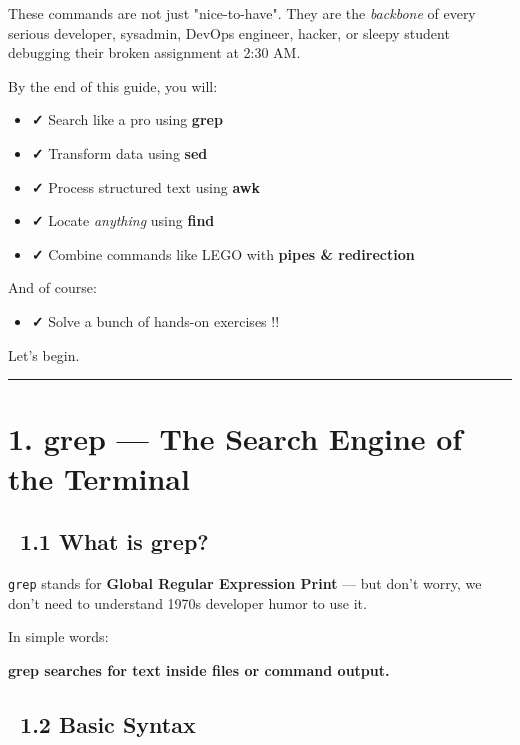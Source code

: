 \documentclass[12pt]{article}
\newcommand{\searchicon}{\faSearch}
\newcommand{\brainicon}{\faBrain}
\newcommand{\checkicon}{\faCheck}
\begin{document}
These commands are not just "nice-to-have".
They are the \textit{backbone} of every serious developer, sysadmin, DevOps engineer, hacker, or sleepy student debugging their broken assignment at 2:30 AM.

By the end of this guide, you will:

\begin{itemize}
    \item \textbf{\checkicon} Search like a pro using \textbf{grep}
    \item \textbf{\checkicon} Transform data using \textbf{sed}
    \item \textbf{\checkicon} Process structured text using \textbf{awk}
    \item \textbf{\checkicon} Locate \textit{anything} using \textbf{find}
    \item \textbf{\checkicon} Combine commands like LEGO with \textbf{pipes \& redirection}
\end{itemize}

And of course:
\begin{itemize}
    \item \textbf{\checkicon} Solve a bunch of hands-on exercises !!
\end{itemize}

Let's begin.

\vspace{1em}
\begin{center}
\color{teamred}\rule{0.8\textwidth}{1pt}
\end{center}

\section*{1. grep — The Search Engine of the Terminal}

\subsection*{\searchicon\ 1.1 What is grep?}

\texttt{grep} stands for \textbf{Global Regular Expression Print} — but don't worry, we don't need to understand 1970s developer humor to use it.

In simple words:

\begin{infobox}
\textbf{grep searches for text inside files or command output.}
\end{infobox}

\subsection*{\brainicon\ 1.2 Basic Syntax}
\end{document}
